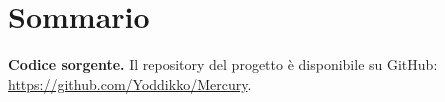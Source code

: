\documentclass[twoside,12pt,openright]{report}
\begin{document}


\newpage
\null
\newpage

\chapter*{Sommario}


\vspace{1em}
\noindent\textbf{Codice sorgente.} Il repository del progetto è disponibile su
GitHub: \url{https://github.com/Yoddikko/Mercury}.

\tableofcontents



\printbibliography[heading=bibintoc]
\end{document}
